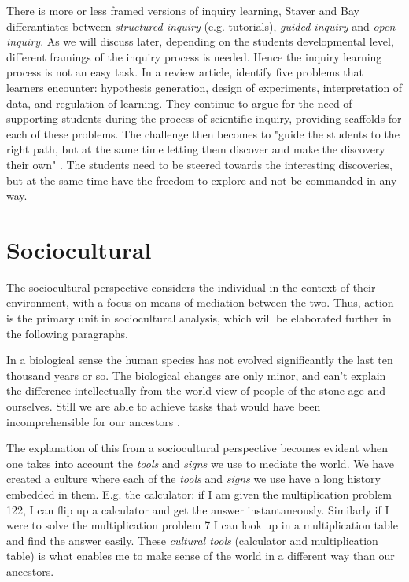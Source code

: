 There is more or less framed versions of inquiry learning, Staver and Bay \citetext{(1987) referenced in \citealp{prince2006inductive}} differantiates between \emph{structured inquiry} (e.g. tutorials), \emph{guided inquiry} and \emph{open inquiry}. As we will discuss later, depending on the students developmental level, different framings of the inquiry process is needed. Hence the inquiry learning process is not an easy task. In a review article, \citet{de1998scientific} identify five problems that learners encounter: hypothesis generation, design of experiments, interpretation of data, and regulation of learning. They continue to argue for the need of supporting students during the process of scientific inquiry, providing scaffolds for each of these problems. The challenge then becomes to "guide the students to the right path, but at the same time letting them discover and make the discovery their own" \citep{kluge2010simulation}. The students need to be steered towards the interesting discoveries, but at the same time have the freedom to explore and not be commanded in any way. 
 

\section{Sociocultural}
The sociocultural perspective considers the individual in the context of their environment, with a focus on means of mediation between the two. Thus, action is the primary unit in sociocultural analysis, which will be elaborated further in the following paragraphs. 

In a biological sense the human species has not evolved significantly the last ten thousand years or so. The biological changes are only minor, and can’t explain the difference intellectually from the world view of people of the stone age and ourselves. Still we are able to achieve tasks that would have been incomprehensible for our ancestors \citep{saljo2001laering}.

The explanation of this from a sociocultural perspective becomes evident when one takes into account the \emph{tools} and \emph{signs} we use to mediate the world. We have created a culture where each of the \emph{tools} and \emph{signs} we use have a long history embedded in them. E.g. the calculator: if I am given the multiplication problem 122, I can flip up a calculator and get the answer instantaneously. Similarly if I were to solve the multiplication problem 7 I can look up in a multiplication table and find the answer easily. These \emph{cultural tools} (calculator and multiplication table) is what enables me to make sense of the world in a different way than our ancestors. 

